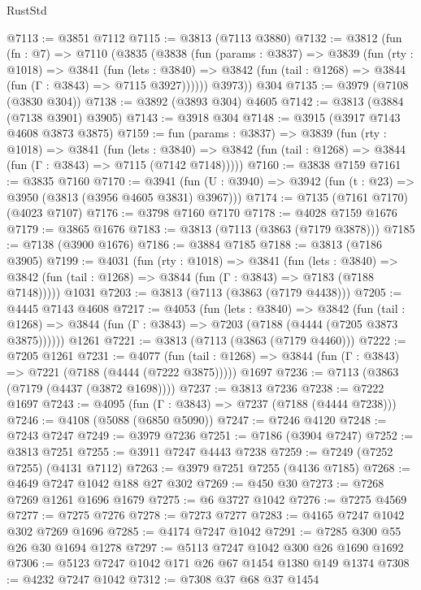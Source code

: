 \begin{lexlean}{RustStd}
\begin{coremodule}
@7113 := @3851 @7112
@7115 := @3813 (@7113 @3880)
@7132 := @3812
    (fun (fn : @7) =>
    @7110
      (@3835
        (@3838
          (fun (params : @3837) =>
          @3839
            (fun (rty : @1018) =>
            @3841
              (fun (lets : @3840) =>
              @3842 (fun (tail : @1268) => @3844 (fun (Γ : @3843) => @7115 @3927))))))
        @3973))
    @304
@7135 := @3979 (@7108 (@3830 @304))
@7138 := @3892 (@3893 @304) @4605
@7142 := @3813 (@3884 (@7138 @3901) @3905)
@7143 := @3918 @304
@7148 := @3915 (@3917 @7143 @4608 @3873 @3875)
@7159 := fun (params : @3837) =>
  @3839
    (fun (rty : @1018) =>
    @3841
      (fun (lets : @3840) =>
      @3842 (fun (tail : @1268) => @3844 (fun (Γ : @3843) => @7115 (@7142 @7148)))))
@7160 := @3838 @7159
@7161 := @3835 @7160
@7170 := @3941 (fun (U : @3940) => @3942 (fun (t : @23) => @3950 (@3813 (@3956 @4605 @3831) @3967)))
@7174 := @7135 (@7161 @7170) (@4023 @7107)
@7176 := @3798 @7160 @7170
@7178 := @4028 @7159 @1676
@7179 := @3865 @1676
@7183 := @3813 (@7113 (@3863 (@7179 @3878)))
@7185 := @7138 (@3900 @1676)
@7186 := @3884 @7185
@7188 := @3813 (@7186 @3905)
@7199 := @4031
    (fun (rty : @1018) =>
    @3841
      (fun (lets : @3840) =>
      @3842 (fun (tail : @1268) => @3844 (fun (Γ : @3843) => @7183 (@7188 @7148)))))
    @1031
@7203 := @3813 (@7113 (@3863 (@7179 @4438)))
@7205 := @4445 @7143 @4608
@7217 := @4053
    (fun (lets : @3840) =>
    @3842
      (fun (tail : @1268) => @3844 (fun (Γ : @3843) => @7203 (@7188 (@4444 (@7205 @3873 @3875))))))
    @1261
@7221 := @3813 (@7113 (@3863 (@7179 @4460)))
@7222 := @7205 @1261
@7231 := @4077
    (fun (tail : @1268) => @3844 (fun (Γ : @3843) => @7221 (@7188 (@4444 (@7222 @3875)))))
    @1697
@7236 := @7113 (@3863 (@7179 (@4437 (@3872 @1698))))
@7237 := @3813 @7236
@7238 := @7222 @1697
@7243 := @4095 (fun (Γ : @3843) => @7237 (@7188 (@4444 @7238)))
@7246 := @4108 (@5088 (@6850 @5090))
@7247 := @7246 @4120
@7248 := @7243 @7247
@7249 := @3979 @7236
@7251 := @7186 (@3904 @7247)
@7252 := @3813 @7251
@7255 := @3911 @7247 @4443 @7238
@7259 := @7249 (@7252 @7255) (@4131 @7112)
@7263 := @3979 @7251 @7255 (@4136 @7185)
@7268 := @4649 @7247 @1042 @188 @27 @302
@7269 := @450 @30
@7273 := @7268 @7269 @1261 @1696 @1679
@7275 := @6 @3727 @1042
@7276 := @7275 @4569
@7277 := @7275 @7276
@7278 := @7273 @7277
@7283 := @4165 @7247 @1042 @302 @7269 @1696
@7285 := @4174 @7247 @1042
@7291 := @7285 @300 @55 @26 @30 @1694 @1278
@7297 := @5113 @7247 @1042 @300 @26 @1690 @1692
@7306 := @5123 @7247 @1042 @171 @26 @67 @1454 @1380 @149 @1374
@7308 := @4232 @7247 @1042
@7312 := @7308 @37 @68 @37 @1454

\end{coremodule}
\end{lexlean}
